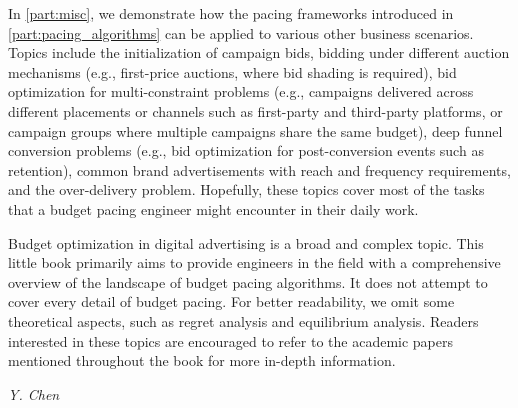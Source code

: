 \documentclass[../Main.tex]{subfiles}
\begin{document}
	 In \autoref{part:misc}, we demonstrate how the pacing frameworks introduced in \autoref{part:pacing_algorithms} can be applied to various other business scenarios. Topics include the initialization of campaign bids, bidding under different auction mechanisms (e.g., first-price auctions, where bid shading is required), bid optimization for multi-constraint problems (e.g., campaigns delivered across different placements or channels such as first-party and third-party platforms, or campaign groups where multiple campaigns share the same budget), deep funnel conversion problems (e.g., bid optimization for post-conversion events such as retention), common brand advertisements with reach and frequency requirements, and the over-delivery problem. Hopefully, these topics cover most of the tasks that a budget pacing engineer might encounter in their daily work.
	 
	 
	 Budget optimization in digital advertising is a broad and complex topic. This little book primarily aims to provide engineers in the field with a comprehensive overview of the landscape of budget pacing algorithms. It does not attempt to cover every detail of budget pacing. For better readability, we omit some theoretical aspects, such as regret analysis and equilibrium analysis. Readers interested in these topics are encouraged to refer to the academic papers mentioned throughout the book for more in-depth information.
	 
	 \begin{flushright}
	 	\textit{Y. Chen}
	 \end{flushright}
	 
	
	
\end{document}
